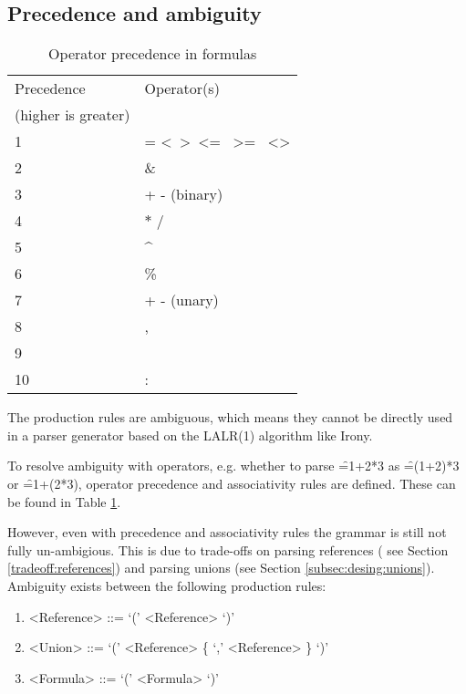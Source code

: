 \subsection{Precedence and ambiguity}
\label{sec:ambiguity}

\begin{table}
\small
\begin{tabular}{ll}
	\toprule
	Precedence & Operator(s) \\
	(higher is greater) & \\
	\midrule
	1 & = \textless \  \textgreater \  \textless= \  \textgreater= \  \textless\textgreater          \\
	2 & \&  \\
	3 & + - (binary) \\
	4 & $\ast$ / \\
	5 & \textasciicircum \\
	6 & \% \\
	7 & + - (unary) \\
	8 & , \\
	9 & \texttt{\char32} \\
	10 & : \\
	\bottomrule
\end{tabular}
\caption{Operator precedence in formulas}
\label{table:operatorprec}
\end{table}


The production rules are ambiguous, which means they cannot be directly used in a parser generator based on the LALR(1) algorithm like Irony.

To resolve ambiguity with operators, e.g. whether to parse \f{=1+2*3} as \f{=(1+2)*3} or \f{=1+(2*3)}, operator precedence and associativity rules are defined.
These can be found in Table \ref{table:operatorprec}.

However, even with precedence and associativity rules the grammar is still not fully un-ambigious.
This is due to trade-offs on parsing references ( see Section \ref{tradeoff:references}) and parsing unions (see Section \ref{subsec:desing:unions}).
Ambiguity exists between the following production rules:
\begin{enumerate}
	\item \begin{grammar}<Reference> ::= `(' <Reference> `)'\end{grammar}
	\item \begin{grammar}<Union> ::= `(' <Reference> \{ `,' <Reference> \} `)'\end{grammar}
	\item \begin{grammar}<Formula> ::= `(' <Formula> `)'\end{grammar}
\end{enumerate}

